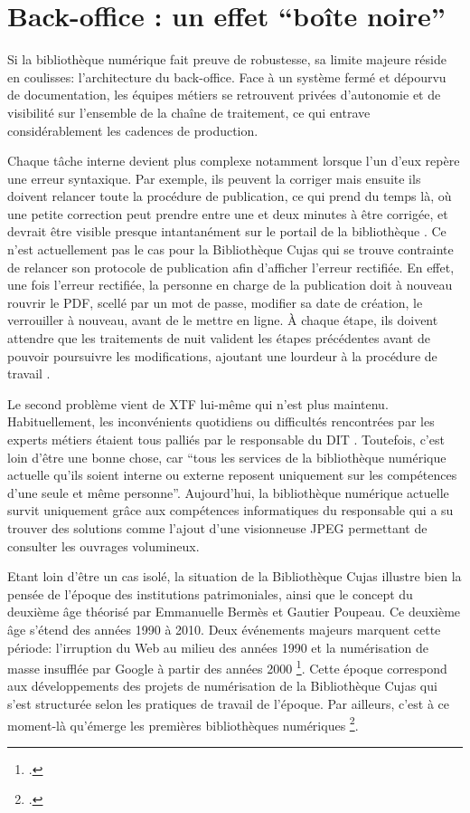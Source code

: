 \section{Back-office : un effet \enquote{boîte noire}}
Si la bibliothèque numérique fait preuve de robustesse, sa limite majeure réside en coulisses: l'architecture du back-office. Face à un système fermé et dépourvu de documentation, les équipes métiers se retrouvent privées d'autonomie et de visibilité sur l'ensemble de la chaîne de traitement, ce qui entrave considérablement les cadences de production. 

Chaque tâche interne devient plus complexe notamment lorsque l'un d'eux repère une erreur syntaxique. Par exemple, ils peuvent la corriger mais ensuite ils doivent relancer toute la procédure de publication, ce qui prend du temps là, où une petite correction peut prendre entre une et deux minutes à être corrigée, et devrait être visible presque intantanément sur le portail de la bibliothèque . Ce n'est actuellement pas le cas pour la Bibliothèque Cujas qui se trouve contrainte de relancer son protocole de publication afin d'afficher l'erreur rectifiée. En effet, une fois l'erreur rectifiée, la personne en charge de la publication doit à nouveau rouvrir le \ac{PDF}, scellé par un mot de passe, modifier sa date de création, le verrouiller à nouveau, avant de le mettre en ligne. À chaque étape, ils doivent attendre que les traitements de nuit valident les étapes précédentes avant de pouvoir poursuivre les modifications, ajoutant une lourdeur à la procédure de travail . 

Le second problème vient de \ac{XTF} lui-même qui n'est plus maintenu. Habituellement, les inconvénients quotidiens ou difficultés rencontrées par les experts métiers étaient tous palliés par le responsable du \ac{DIT} . Toutefois, c'est loin d'être une bonne chose, car \enquote{tous les services de la bibliothèque numérique actuelle qu'ils soient interne ou externe reposent uniquement sur les compétences d'une seule et même personne}. Aujourd'hui, la bibliothèque numérique actuelle survit uniquement grâce aux compétences informatiques du responsable qui a su trouver des solutions comme l'ajout d'une visionneuse \ac{JPEG} permettant de consulter les ouvrages volumineux. 

Etant loin d'être un cas isolé, la situation de la Bibliothèque Cujas illustre bien la pensée de l'époque des institutions patrimoniales, ainsi que le concept du deuxième âge théorisé par Emmanuelle Bermès et Gautier Poupeau. Ce deuxième âge s'étend des années 1990 à 2010. Deux événements majeurs marquent cette période: l'irruption du Web au milieu des années 1990 et la numérisation de masse insufflée par Google à partir des années 2000 \footcite{bermesTroisAgesNumerique}. Cette époque correspond aux développements des projets de numérisation de la Bibliothèque Cujas qui s'est structurée selon les pratiques de travail de l'époque. Par ailleurs, c'est à ce moment-là qu'émerge les premières bibliothèques numériques \footcite{bermesTroisAgesNumerique}. 

